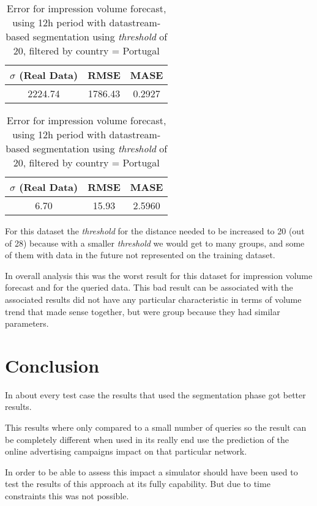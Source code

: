 \begin{table}[!ht]
\centering
\footnotesize
\begin{minipage}[t]{0.45\linewidth}
\centering
\footnotesize
\begin{tabular}{ccc}
 $\sigma$ (Real Data) & RMSE & MASE   \\ \hline
2224.74 & 1786.43 & 0.2927 \\
\end{tabular}

\vspace{0.5cm}

\caption[Volume
impression forecast, real data, datastream]{Error for impression volume
forecast, using 12h period with datastream-based segmentation using
\emph{threshold} of 20}
\label{tab:err_forecast_12_real_datastream_filtered}
\end{minipage}
\quad
\begin{minipage}[t]{0.45\linewidth}
\centering
\footnotesize
\begin{tabular}{ccc}
 $\sigma$ (Real Data) & RMSE & MASE   \\ \hline
6.70 & 15.93 & 2.5960 \\
\end{tabular}

\vspace{0.5cm}

\caption[Volume
impression forecast, real data, datastream, filtered]{Error for impression volume
forecast, using 12h period with datastream-based segmentation using
\emph{threshold} of 20, filtered by country = Portugal}
\label{tab:err_forecast_12_real_datastream_filtered}
\end{minipage}

\end{table}

For this dataset the \emph{threshold} for the distance needed to be increased to
20 (out of 28) because with a smaller \emph{threshold} we would get to many
groups, and some of them with data in the future not represented on the training
dataset.

In overall analysis this was the worst result for this dataset for impression
volume forecast and for the queried data. This bad result can be associated with
the associated results did not have any particular characteristic in terms of
volume trend that made sense together, but were group because they had similar
parameters.

\section{Conclusion}

In about every test case the results that used the segmentation phase got better
results.

This results where only compared to a small number of queries so the result can
be completely different when used in its really end use the prediction of the
online advertising campaigns impact on that particular network.

In order to be able to assess this impact a simulator should have been used to
test the results of this approach at its fully capability. But due to time
constraints this was not possible.
